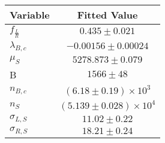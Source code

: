 \begin{tabular}[t]{lc}
\hline
Variable &Fitted Value\\
\hline\hline
$f_{\frac{L}{R}}$&$0.435\pm0.021$\\
\hline
$\lambda_{B,c}$&$-0.00156\pm0.00024$\\
\hline
$\mu_S$&$5278.873\pm0.079$\\
\hline
B&$1566\pm48$\\
\hline
$n_{B,c}$&$(6.18\pm0.19)\times 10^3$\\
\hline
$n_S$&$(5.139\pm0.028)\times 10^4$\\
\hline
$\sigma_{L, S}$&$11.02\pm0.22$\\
\hline
$\sigma_{R, S}$&$18.21\pm0.24$\\
\hline
\end{tabular}